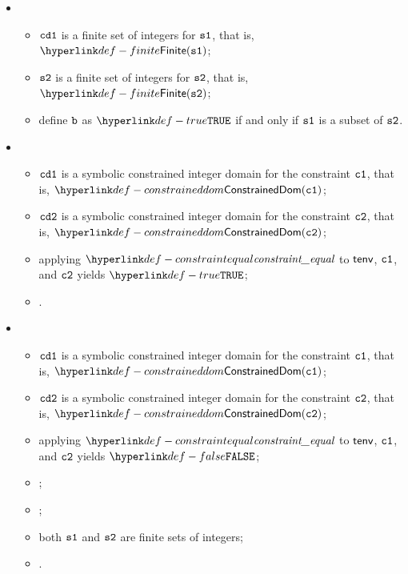 \ProseParagraph
\OneApplies
\begin{itemize}
  \item {}
  \begin{itemize}
    \item $\texttt{cd1}$ is a finite set of integers for $\vsone$, that is, $\Finite(\vsone)$;
    \item $\vstwo$ is a finite set of integers for $\vstwo$, that is, $\Finite(\vstwo)$;
    \item define $\vb$ as $\True$ if and only if $\vsone$ is a subset of $\vstwo$.
  \end{itemize}

  \item {}
  \begin{itemize}
    \item $\texttt{cd1}$ is a symbolic constrained integer domain for the constraint $\vcone$, that is, $\ConstrainedDom(\vcone)$;
    \item $\texttt{cd2}$ is a symbolic constrained integer domain for the constraint $\vctwo$, that is, $\ConstrainedDom(\vctwo)$;
    \item applying $\constraintequal$ to $\tenv$, $\vcone$, and $\vctwo$ yields $\True$;
    \item \Proseeqdef{$\vb$}{$\True$}.
  \end{itemize}

  \item {}
  \begin{itemize}
    \item $\texttt{cd1}$ is a symbolic constrained integer domain for the constraint $\vcone$, that is, $\ConstrainedDom(\vcone)$;
    \item $\texttt{cd2}$ is a symbolic constrained integer domain for the constraint $\vctwo$, that is, $\ConstrainedDom(\vctwo)$;
    \item applying $\constraintequal$ to $\tenv$, $\vcone$, and $\vctwo$ yields $\False$;
    \item \Proseapproxconstraint{$\tenv$}{$\vcone$}{$\Over$}{$\vsone$};
    \item \Proseapproxconstraint{$\tenv$}{$\vctwo$}{$\Under$}{$\vstwo$};
    \item both $\vsone$ and $\vstwo$ are finite sets of integers;
    \item {}.
  \end{itemize}


\end{itemize}

